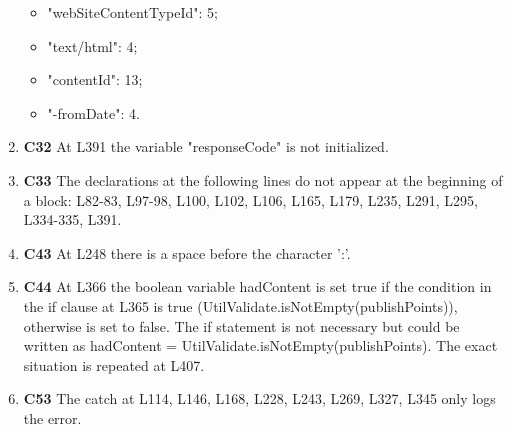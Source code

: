 \begin{enumerate}
\begin{itemize}
	\item "webSiteContentTypeId": 5;
	\item "text/html": 4;
	\item "contentId": 13;
	\item "-fromDate": 4.
	\end{itemize} 
\item \textbf{C32} At L391 the variable "responseCode" is not initialized.
\item \textbf{C33} The declarations at the following lines do not appear at the beginning of a block: L82-83, L97-98, L100, L102, L106, L165, L179, L235, L291, L295, L334-335, L391. 
\item \textbf{C43} At L248 there is a space before the character ':'.
\item \textbf{C44} At L366 the boolean variable hadContent is set true if the condition in the if clause at L365 is true (UtilValidate.isNotEmpty(publishPoints)), otherwise is set to false. The if statement is not necessary but could be written as hadContent = UtilValidate.isNotEmpty(publishPoints). The exact situation is repeated at L407.
\item \textbf{C53} The catch at L114, L146, L168, L228, L243, L269, L327, L345 only logs the error.
\end{enumerate}